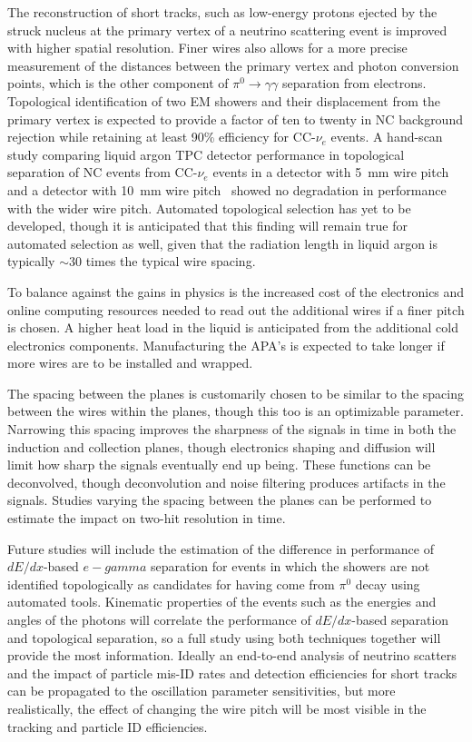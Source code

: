 The reconstruction of short tracks, such as low-energy
protons ejected by the struck nucleus at the primary vertex of a neutrino scattering event
is improved with higher spatial resolution.  Finer wires also allows for a more precise measurement
of the distances between the primary vertex and photon conversion points, which is the other
component of $\pi^0\rightarrow\gamma\gamma$ separation from electrons.  Topological
identification of two EM showers and their displacement from the primary vertex is expected
to provide a factor of ten to twenty in NC background rejection while retaining at least 90\%
efficiency for CC-$\nu_e$ events.  A hand-scan study comparing liquid argon TPC detector performance
in topological separation of NC events from CC-$\nu_e$ events in a detector with 5~mm wire pitch
and a detector with 10~mm wire pitch~\cite{2008-hand-scan} showed no degradation in performance with
the wider wire pitch.  Automated topological selection has yet to be developed, though it is
anticipated that this finding will remain true for automated selection as well, given that the
radiation length in liquid argon is typically $\sim$30 times the typical wire spacing.

To balance against the gains in physics is the increased cost of the electronics and
online computing resources needed to read out the additional wires if a finer pitch is chosen.
A higher heat load in the liquid is anticipated from the additional cold electronics components.
Manufacturing the APA's is expected to take longer if more wires are to be installed and wrapped.

The spacing between the planes is customarily chosen to be similar to the spacing between
the wires within the planes, though this too is an optimizable parameter.  Narrowing this
spacing improves the sharpness of the signals in time in both the induction and collection planes,
though electronics shaping and diffusion will limit how sharp the signals eventually end up being.
These functions can be deconvolved, though deconvolution and noise filtering produces 
artifacts in the signals.  Studies varying the spacing between the planes can be performed
to estimate the impact on two-hit resolution in time.

Future studies will include the estimation of the difference in performance of $dE/dx$-based
$e-gamma$ separation for events in which the showers are not identified topologically as
candidates for having come from $\pi^0$ decay using automated tools.  Kinematic properties
of the events such as the energies and angles of the photons will correlate the performance
of $dE/dx$-based separation and topological separation, so a full study using both techniques
together will provide the most information.  Ideally an end-to-end analysis of neutrino
scatters and the impact of particle mis-ID rates and detection efficiencies for short tracks
can be propagated to the oscillation parameter sensitivities, but more realistically, the
effect of changing the wire pitch will be most visible in the 
tracking and particle ID efficiencies.

